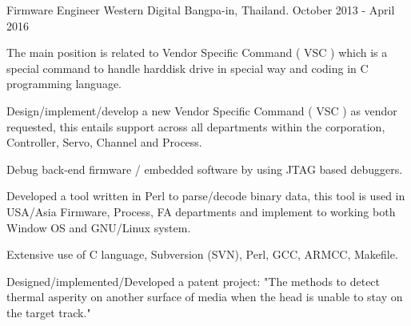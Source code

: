 \begin{cventries}
  \cventry
    {Firmware Engineer} %
    {Western Digital} %
    {Bangpa-in, Thailand.} %
    {October 2013 - April 2016} %
    {
      \begin{cvitems} %
         \item {The main position is related to Vendor Specific Command ( VSC ) which is a special command to handle
          harddisk drive in special way and coding in C programming language.}
         \item {Design/implement/develop a new Vendor Specific Command ( VSC ) as vendor
         requested, this entails support across all departments within the corporation,
         Controller, Servo, Channel and Process.}
         \item {Debug back-end firmware / embedded software by using JTAG based
           debuggers.}
         \item {Developed a tool written in Perl to parse/decode binary data,
         this tool is used in USA/Asia Firmware, Process, FA departments and implement to
         working both Window OS and GNU/Linux system.}
         \item {Extensive use of C language, Subversion (SVN), Perl, GCC, ARMCC,
           Makefile.}
         \item {Designed/implemented/Developed a patent project: "The methods to detect thermal asperity on another
          surface of media when the head is unable to stay on the target track."}
      \end{cvitems}
    }

\end{cventries}
